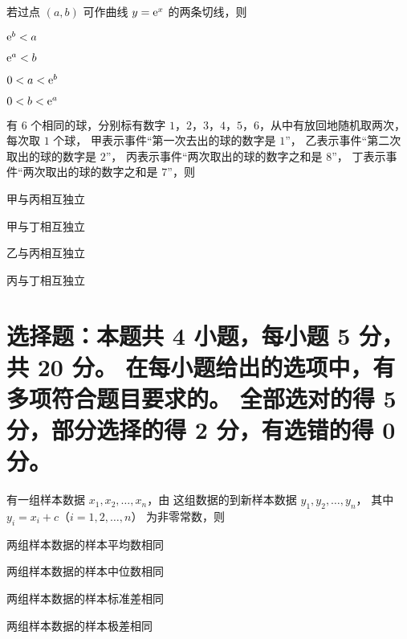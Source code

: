 \documentclass{exam-zh}
\begin{document}
\begin{question}
  若过点 $(a, b)$ 可作曲线 $y = \mathrm{ e }^x$ 的两条切线，则 \paren
  \begin{choices}
    \item $\mathrm{ e }^b < a$
    \item $\mathrm{ e }^a < b$
    \item $0 < a < \mathrm{ e }^b$
    \item $0 < b < \mathrm{ e }^a$
  \end{choices}
\end{question}

\begin{question}
  有 $6$ 个相同的球，分别标有数字 $1$，$2$，$3$，$4$，$5$，$6$，从中有放回地随机取两次，每次取 $1$ 个球，
  甲表示事件“第一次去出的球的数字是 $1$”，
  乙表示事件“第二次取出的球的数字是 $2$”，
  丙表示事件“两次取出的球的数字之和是 $8$”，
  丁表示事件“两次取出的球的数字之和是 $7$”，则 \paren
  \begin{choices}
    \item 甲与丙相互独立
    \item 甲与丁相互独立
    \item 乙与丙相互独立
    \item 丙与丁相互独立
  \end{choices}
\end{question}



\section{%
  选择题：本题共 4 小题，每小题 5 分，共 20 分。
  在每小题给出的选项中，有多项符合题目要求的。
  全部选对的得 5 分，部分选择的得 2 分，有选错的得 0 分。
}

\begin{question}
  有一组样本数据 $x_1, x_2, \dots, x_n$，由 这组数据的到新样本数据 $y_1, y_2, \dots, y_n$，
  其中 $y_i = x_i + c$（$i = 1, 2, \dots, n$） 为非零常数，则 \paren
  \begin{choices}
    \item 两组样本数据的样本平均数相同
    \item 两组样本数据的样本中位数相同
    \item 两组样本数据的样本标准差相同
    \item 两组样本数据的样本极差相同
  \end{choices}
\end{question}
\end{document}
